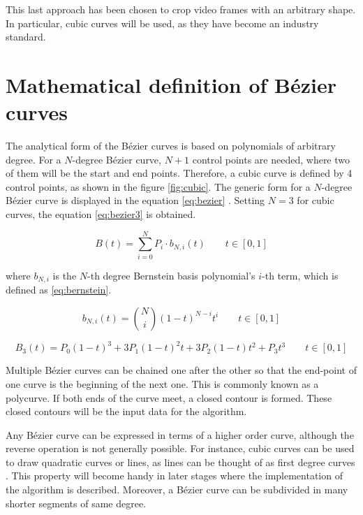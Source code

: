 \documentclass[\topdir/main.tex]{subfiles}
\begin{document}
This last approach has been chosen to crop video frames with an arbitrary shape. In particular, cubic curves will be used, as they have become an industry standard.

\section{Mathematical definition of Bézier curves}
The analytical form of the Bézier curves is based on polynomials of arbitrary degree. For a $N$-degree Bézier curve, $N+1$ control points are needed, where two of them will be the start and end points. Therefore, a cubic curve is defined by 4 control points, as shown in the figure \ref{fig:cubic}. The generic form for a $N$-degree Bézier curve is displayed in the equation \eqref{eq:bezier} \cite{pomax:bezier, wiki:bezier}. Setting $N=3$ for cubic curves, the equation \eqref{eq:bezier3} is obtained.\newline

\begin{equation} \label{eq:bezier}
    B(t) = \sum_{i = 0}^{N} P_i \cdot b_{N,i}(t) \qquad t \in [0, 1]
\end{equation}

where $b_{N,i}$ is the $N$-th degree Bernstein basis polynomial's $i$-th term, which is defined as \eqref{eq:bernstein}.\newline

\begin{equation} \label{eq:bernstein}
    b_{N,i}(t) = \binom{N}{i} (1-t)^{N-i} t^i \qquad t \in [0, 1]
\end{equation}

\begin{equation} \label{eq:bezier3}
    B_3(t) = P_0(1-t)^3 + 3P_1(1-t)^2t + 3P_2(1-t)t^2 + P_3t^3 \qquad t \in [0, 1]
\end{equation}

Multiple Bézier curves can be chained one after the other so that the end-point of one curve is the beginning of the next one. This is commonly known as a polycurve. If both ends of the curve meet, a closed contour is formed. These closed contours will be the input data for the algorithm.\newline 

Any Bézier curve can be expressed in terms of a higher order curve, although the reverse operation is not generally possible. For instance, cubic curves can be used to draw quadratic curves or lines, as lines can be thought of as first degree curves \cite{pomax:bezier}. This property will become handy in later stages where the implementation of the algorithm is described. Moreover, a Bézier curve can be subdivided in many shorter segments of same degree.\newline
\end{document}
